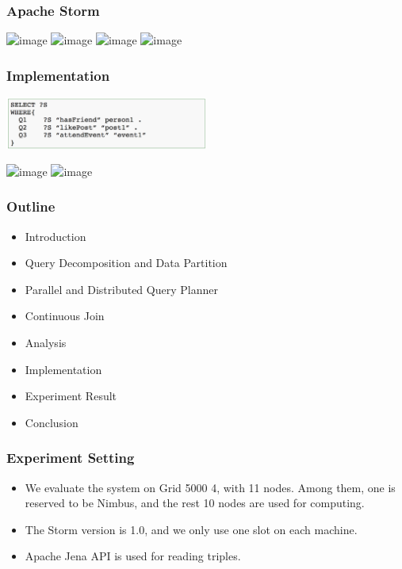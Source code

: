 \begin{frame}
\frametitle{Apache Storm}
    \begin{center}
    	\includegraphics<1>[width=0.8\textwidth]{figs/storm.png}
    	\includegraphics<2>[height=0.5\textwidth]{figs/storm1.png}
    \includegraphics<3>[height=0.5\textwidth]{figs/storm2.png} 
    \includegraphics<4>[height=0.5\textwidth]{figs/storm3.png}
    \end{center}
\end{frame}

\begin{frame}
\frametitle{Implementation}
\vspace{-0.1in}
\begin{center}
\includegraphics[width=0.5\textwidth]{figs/examplequery.png}
\end{center}
\vspace{-0.2in}
    \begin{center}
    	\includegraphics<1>[width=0.8\textwidth]{figs/implementation1.png}
    	\includegraphics<2>[width=0.8\textwidth]{figs/implementation2.png}
    \end{center}
\end{frame}


\begin{frame}
\frametitle{Outline}
	\begin{itemize}
		\item Introduction
		\item Query Decomposition and Data Partition
		\item Parallel and Distributed Query Planner
		\item Continuous Join
		\item Analysis
		\item Implementation
		\item Experiment Result
		\item \textcolor{blue!20}{Conclusion}
	\end{itemize}
\end{frame}

\begin{frame}
\frametitle{Experiment Setting}
\begin{itemize}
\item We evaluate the system on Grid 5000 4, with 11 nodes. Among them, one is reserved to be Nimbus, and the rest 10 nodes are used for computing. 

\item The Storm version is 1.0, and we only use one slot on each machine.

\item Apache Jena API is used for reading triples.
\end{itemize}

\end{frame}

